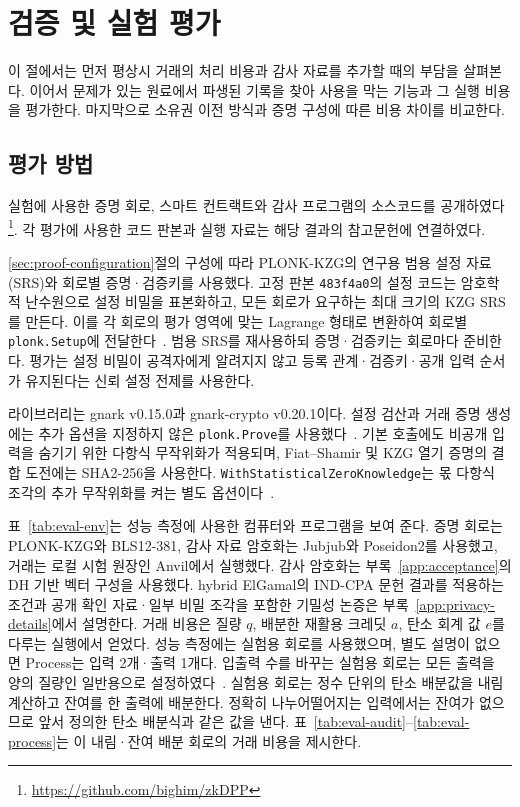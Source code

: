 \section{검증 및 실험 평가}
\label{sec:evaluation}

이 절에서는 먼저 평상시 거래의 처리 비용과 감사 자료를 추가할 때의
부담을 살펴본다. 이어서 문제가 있는 원료에서 파생된 기록을 찾아
사용을 막는 기능과 그 실행 비용을 평가한다. 마지막으로 소유권 이전 방식과
증명 구성에 따른 비용 차이를 비교한다.

\subsection{평가 방법}
\label{sec:evaluation-method}

실험에 사용한 증명 회로, 스마트 컨트랙트와 감사 프로그램의
소스코드를 공개하였다\footnote{\url{https://github.com/bighim/zkDPP}}.
각 평가에 사용한 코드 판본과 실행 자료는
해당 결과의 참고문헌에 연결하였다.

\ref{sec:proof-configuration}절의 구성에 따라 PLONK-KZG의
연구용 범용 설정 자료(SRS)와 회로별 증명·검증키를 사용했다.
고정 판본 \texttt{483f4a0}의 설정 코드는 암호학적 난수원으로
설정 비밀을 표본화하고, 모든 회로가 요구하는 최대 크기의 KZG SRS를
만든다. 이를 각 회로의 평가 영역에 맞는 Lagrange 형태로 변환하여
회로별 \texttt{plonk.Setup}에 전달한다~\cite{zkdpp-implementation-profile-2026}.
범용 SRS를 재사용하되 증명·검증키는 회로마다 준비한다.
평가는 설정 비밀이 공격자에게 알려지지 않고 등록 관계·검증키·공개 입력
순서가 유지된다는 신뢰 설정 전제를 사용한다.

라이브러리는 gnark v0.15.0과 gnark-crypto v0.20.1이다.
설정 검산과 거래 증명 생성에는 추가 옵션을 지정하지 않은
\texttt{plonk.Prove}를 사용했다~\cite{zkdpp-implementation-profile-2026}.
기본 호출에도 비공개 입력을 숨기기 위한 다항식 무작위화가 적용되며,
Fiat--Shamir 및 KZG 열기 증명의 결합 도전에는 SHA2-256을 사용한다.
\texttt{WithStatisticalZeroKnowledge}는 몫 다항식 조각의 추가
무작위화를 켜는 별도 옵션이다~\cite{gnark-plonk-options-015}.

표~\ref{tab:eval-env}는 성능 측정에 사용한 컴퓨터와
프로그램을 보여 준다. 증명 회로는 PLONK-KZG와 BLS12-381,
감사 자료 암호화는 Jubjub와 Poseidon2를 사용했고,
거래는 로컬 시험 원장인 Anvil에서 실행했다.
감사 암호화는 부록~\ref{app:acceptance}의 DH 기반 벡터 구성을
사용했다. hybrid ElGamal의 IND-CPA 문헌 결과를 적용하는 조건과
공개 확인 자료·일부 비밀 조각을 포함한 기밀성 논증은
부록~\ref{app:privacy-details}에서 설명한다.
거래 비용은 질량 $q$, 배분한 재활용 크레딧 $a$,
탄소 회계 값 $e$를 다루는 실행에서 얻었다.
성능 측정에는 실험용 회로를 사용했으며,
별도 설명이 없으면 Process는 입력 2개·출력 1개다.
입출력 수를 바꾸는 실험용 회로는 모든 출력을 양의 질량인
일반용으로 설정하였다~\cite{zkdpp-implementation-profile-2026}.
실험용 회로는 정수 단위의 탄소 배분값을 내림 계산하고 잔여를
한 출력에 배분한다.
정확히 나누어떨어지는 입력에서는 잔여가 없으므로
앞서 정의한 탄소 배분식과 같은 값을 낸다.
표~\ref{tab:eval-audit}--\ref{tab:eval-process}는
이 내림·잔여 배분 회로의 거래 비용을 제시한다.

